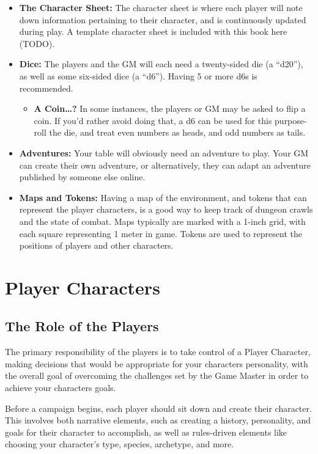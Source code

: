 \documentclass[
  11pt,
  letterpaper,
]{scrbook}
\providecommand{\tightlist}{%
  \setlength{\itemsep}{0pt}\setlength{\parskip}{0pt}}
\begin{document}
\begin{itemize}
\item
  \textbf{The Character Sheet:} The character sheet is where each player
  will note down information pertaining to their character, and is
  continuously updated during play. A template character sheet is
  included with this book here (TODO).
\item
  \textbf{Dice:} The players and the GM will each need a twenty-sided
  die (a ``d20''), as well as some six-sided dice (a ``d6''). Having 5
  or more d6s is recommended.

  \begin{itemize}
  \tightlist
  \item
    \textbf{A Coin\ldots?} In some instances, the players or GM may be
    asked to flip a coin. If you'd rather avoid doing that, a d6 can be
    used for this purpose- roll the die, and treat even numbers as
    heads, and odd numbers as tails.
  \end{itemize}
\item
  \textbf{Adventures:} Your table will obviously need an adventure to
  play. Your GM can create their own adventure, or alternatively, they
  can adapt an adventure published by someone else online.
\item
  \textbf{Maps and Tokens:} Having a map of the environment, and tokens
  that can represent the player characters, is a good way to keep track
  of dungeon crawls and the state of combat. Maps typically are marked
  with a 1-inch grid, with each square representing 1 meter in game.
  Tokens are used to represent the positions of players and other
  characters.
\end{itemize}

\part{Player Characters}

\chapter{The Role of the Players}\label{the-role-of-the-players}

The primary responsibility of the players is to take control of a Player
Character, making decisions that would be appropriate for your
characters personality, with the overall goal of overcoming the
challenges set by the Game Master in order to achieve your characters
goals.

Before a campaign begins, each player should sit down and create their
character. This involves both narrative elements, such as creating a
history, personality, and goals for their character to accomplish, as
well as rules-driven elements like choosing your character's type,
species, archetype, and more.
\end{document}
